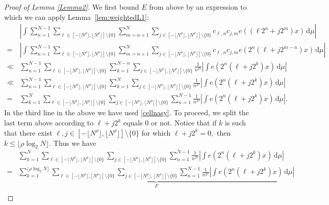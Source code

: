 \documentclass[amssymb,amsfonts,refcheck,12pt,verbatim,righttag]{amsart}
\numberwithin{equation}{section} %
\theoremstyle{plain}
\begin{document}
\begin{proof}[Proof of Lemma \ref{Lemma2}]
We first bound $E$ from above by an expression to which we can apply Lemma~\ref{lem:weightedL1}:
	\begin{align*}
		&\left|\int \sum_{n=1}^{N-1}\sum_{\ell\in [-\lfloor N^{\rho}\rfloor,\lfloor N^{ \rho}\rfloor]\setminus\{0\}}\sum_{m=n+1}^{N}\sum_{j\in [-\lfloor N^{\rho}\rfloor,\lfloor N^{ \rho}\rfloor]\setminus\{0\}}c_{\ell,n}c_{j,m}e((\ell 2^n+j2^m)x)\, \mathrm{d}\mu\right| \\
		=&\left|\int \sum_{n=1}^{N-1}\sum_{\ell\in [-\lfloor N^{\rho}\rfloor,\lfloor N^{ \rho}\rfloor]\setminus\{0\}}\sum_{m=n+1}^{N}\sum_{j\in [-\lfloor N^{\rho}\rfloor,\lfloor N^{ \rho}\rfloor]\setminus\{0\}}c_{\ell,n}c_{j,m}e(2^{n}(\ell+j2^{m-n})x)\, \mathrm{d}\mu\right|\\
		\ll & \sum_{n=1}^{N-1}\sum_{\ell\in [-\lfloor N^{\rho}\rfloor,\lfloor N^{ \rho}\rfloor]\setminus\{0\}}\sum_{k=1}^{N-n}\sum_{j\in [-\lfloor N^{ \rho}\rfloor,\lfloor N^{ \rho}\rfloor]\setminus\{0\}}\frac{1}{n^{2\tau}}\left|\int e(2^{n}(\ell+j2^k)x)\, \mathrm{d}\mu\right|\\
		\ll & \sum_{n=1}^{N-1}\sum_{\ell\in [-\lfloor N^{\rho}\rfloor,\lfloor 
        N^{\rho}\rfloor]\setminus\{0\}}\sum_{k=1}^{N}\sum_{j\in [-\lfloor N^{\rho}\rfloor,\lfloor 
        N^{\rho}\rfloor]\setminus\{0\}}\frac{1}{n^{2\tau}}\left|\int e(2^{n}(\ell+j2^k)x)\, \mathrm{d}\mu\right|\\
		= & \sum_{k=1}^{N}\sum_{\ell\in [-\lfloor 
        N^{\rho}\rfloor,\lfloor 
        N^{\rho}\rfloor]\setminus\{0\}} \sum_{j\in [-\lfloor N^{\rho}\rfloor,\lfloor 
        N^{\rho}\rfloor]\setminus\{0\}} \sum_{n=1}^{N-1}\frac{1}{n^{2\tau}}\left|\int e(2^{n}(\ell+j2^k)x)\, \mathrm{d}\mu\right|.
	\end{align*}
	In the third line in the above we have used \eqref{cellnasy}. To proceed, we split the last term above according to $\ell+j2^k$ equals $0$ or not. Notice that if $k$ is such that there exist $\ell,j\in [-\lfloor 
    N^{\rho}\rfloor,\lfloor N^{\rho}\rfloor]\setminus\{0\}$ for which $\ell+j2^{k}=0,$ then $k\leq \lfloor\rho\log_{2}N \rfloor$. Thus we have
	\begin{align*}
		&\sum_{k=1}^{N}\sum_{\ell \in [-\lfloor N^{ \rho}\rfloor,\lfloor N^{ \rho}\rfloor]\setminus\{0\}}\sum_{j\in [-\lfloor N^{\rho}\rfloor,\lfloor N^{ \rho}\rfloor]\setminus\{0\}} \sum_{n=1}^{N-1}\frac{1}{n^{2\tau}}\left|\int e(2^{n}(\ell+j2^k)x)\, \mathrm{d}\mu\right|\\
 =&\underbrace{\sum_{k=1}^{\lfloor\rho\log_{2}N \rfloor}\sum_{\ell\in [-\lfloor N^{ \rho}\rfloor,\lfloor N^{ \rho}\rfloor]\setminus\{0\}}\sum_{j\in [-\lfloor N^{ \rho}\rfloor,\lfloor N^{ \rho}\rfloor]\setminus\{0\}} \sum_{n=1}^{N-1}\frac{1}{n^{2\tau}}\left|\int e(2^{n}(\ell+j2^k)x)\, \mathrm{d}\mu\right|}_{F}\\

\end{align*}
\end{proof}
\end{document}

